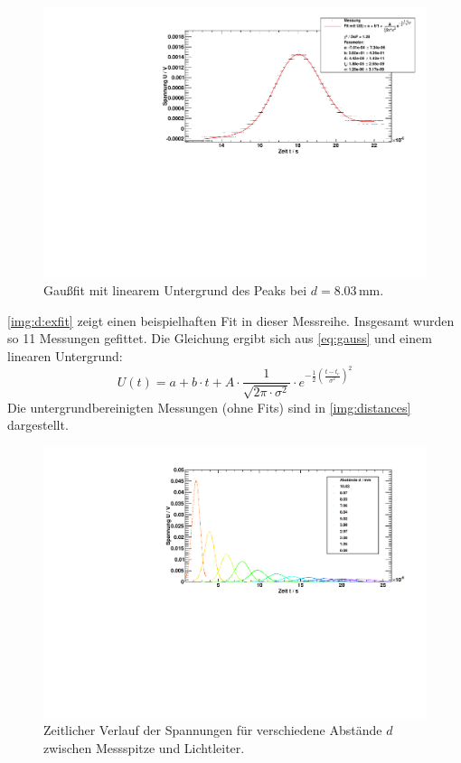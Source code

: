 \begin{figure}[H]
\begin{center}
  \includegraphics[width=\textwidth]{../img/part2/dist02.pdf}
  \caption{Gaußfit mit linearem Untergrund des Peaks bei $d=8.03$\,mm.}
  \label{img:d:exfit}
\end{center}
\end{figure}
\autoref{img:d:exfit} zeigt einen beispielhaften Fit in dieser Messreihe. Insgesamt wurden so 11 Messungen gefittet. Die Gleichung ergibt sich 
aus \autoref{eq:gauss} und einem linearen Untergrund:
\begin{equation}
  U(t) = a + b \cdot t + A \cdot \frac{1}{\sqrt{2  \pi  \cdot \sigma^2}} \cdot
  e^{-\frac{1}{2} \left( \frac{t - t_{\text{c}}}{\sigma^2} \right)^2}
\end{equation}
Die untergrundbereinigten Messungen (ohne Fits) sind in \autoref{img:distances} dargestellt.
\begin{figure}[H]
\begin{center}
  \includegraphics[width=\textwidth]{../img/part2/distances.pdf}
  \caption{Zeitlicher Verlauf der Spannungen für verschiedene Abstände $d$ zwischen Messspitze und Lichtleiter.}
  \label{img:distances}
\end{center}
\end{figure}

